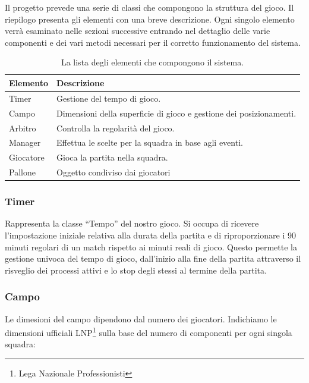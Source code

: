 \documentclass[aps,letterpaper,10pt]{article}
\begin{document}
Il progetto prevede una serie di classi che compongono la struttura del gioco. Il riepilogo presenta gli elementi con una breve descrizione. Ogni singolo elemento verr\`a esaminato nelle sezioni successive entrando nel dettaglio delle varie componenti e dei vari metodi necessari per il corretto funzionamento del sistema.

\begin{table}[H]
\begin{center}
	\begin{tabular}{|l|l|}
		\hline
		\textbf{Elemento} & \textbf{Descrizione} \\ \hline \hline
		Timer & Gestione del tempo di gioco. \\ \hline
		Campo & Dimensioni della superficie di gioco e gestione dei posizionamenti. \\ \hline
		Arbitro & Controlla la regolarit\`a del gioco. \\ \hline
		Manager & Effettua le scelte per la squadra in base agli eventi. \\ \hline
		Giocatore & Gioca la partita nella squadra. \\ \hline
		Pallone & Oggetto condiviso dai giocatori \\ \hline
		\end{tabular}
\end{center}
\caption{La lista degli elementi che compongono il sistema.}
\end{table}

\subsubsection{Timer}

Rappresenta la classe ``Tempo'' del nostro gioco. Si occupa di ricevere l'impostazione iniziale relativa alla durata della partita e di riproporzionare i 90 minuti regolari di un match rispetto ai minuti reali di gioco. Questo permette la gestione univoca del tempo di gioco, dall'inizio alla fine della partita attraverso il risveglio dei processi attivi e lo stop degli stessi al termine della partita.

\subsubsection{Campo}

Le dimesioni del campo dipendono dal numero dei giocatori. Indichiamo le dimensioni ufficiali LNP\footnote{Lega Nazionale Professionisti} sulla base del numero di componenti per ogni singola squadra:
\end{document}
